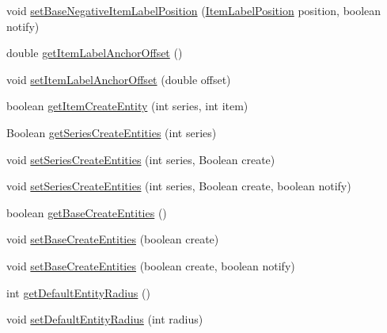 \begin{DoxyCompactItemize}
\item 
void \mbox{\hyperlink{classorg_1_1jfree_1_1chart_1_1renderer_1_1_abstract_renderer_ac595ffca1275bf71a0b27b36f3489d3d}{set\+Base\+Negative\+Item\+Label\+Position}} (\mbox{\hyperlink{classorg_1_1jfree_1_1chart_1_1labels_1_1_item_label_position}{Item\+Label\+Position}} position, boolean notify)
\item 
double \mbox{\hyperlink{classorg_1_1jfree_1_1chart_1_1renderer_1_1_abstract_renderer_aa93f126961e34db9be7db41e8b04054a}{get\+Item\+Label\+Anchor\+Offset}} ()
\item 
void \mbox{\hyperlink{classorg_1_1jfree_1_1chart_1_1renderer_1_1_abstract_renderer_a5699fb01b06e7c7ce94d84f11bf60fa2}{set\+Item\+Label\+Anchor\+Offset}} (double offset)
\item 
boolean \mbox{\hyperlink{classorg_1_1jfree_1_1chart_1_1renderer_1_1_abstract_renderer_ab8e935161d73e01e6435650f056f7307}{get\+Item\+Create\+Entity}} (int series, int item)
\item 
Boolean \mbox{\hyperlink{classorg_1_1jfree_1_1chart_1_1renderer_1_1_abstract_renderer_ab00f0025b38b9114f5fb3fded82628e7}{get\+Series\+Create\+Entities}} (int series)
\item 
void \mbox{\hyperlink{classorg_1_1jfree_1_1chart_1_1renderer_1_1_abstract_renderer_a2e6b07a8f5a71906f27d40c5bfa0ed54}{set\+Series\+Create\+Entities}} (int series, Boolean create)
\item 
void \mbox{\hyperlink{classorg_1_1jfree_1_1chart_1_1renderer_1_1_abstract_renderer_a8b650c74a558f281a55ea4bc9f708031}{set\+Series\+Create\+Entities}} (int series, Boolean create, boolean notify)
\item 
boolean \mbox{\hyperlink{classorg_1_1jfree_1_1chart_1_1renderer_1_1_abstract_renderer_a44d0d70c2ce52e48ba1ccafade04693b}{get\+Base\+Create\+Entities}} ()
\item 
void \mbox{\hyperlink{classorg_1_1jfree_1_1chart_1_1renderer_1_1_abstract_renderer_a7f6e0858465a3692ee7e9fd580ca0c3a}{set\+Base\+Create\+Entities}} (boolean create)
\item 
void \mbox{\hyperlink{classorg_1_1jfree_1_1chart_1_1renderer_1_1_abstract_renderer_a3ecec5aa80585e782546851e2abf7e67}{set\+Base\+Create\+Entities}} (boolean create, boolean notify)
\item 
int \mbox{\hyperlink{classorg_1_1jfree_1_1chart_1_1renderer_1_1_abstract_renderer_aa9bc3e1d149543667cfbd109b19d7477}{get\+Default\+Entity\+Radius}} ()
\item 
void \mbox{\hyperlink{classorg_1_1jfree_1_1chart_1_1renderer_1_1_abstract_renderer_a9624eafc97ea32ccc5685bd6085b5fbf}{set\+Default\+Entity\+Radius}} (int radius)

\end{DoxyCompactItemize}
